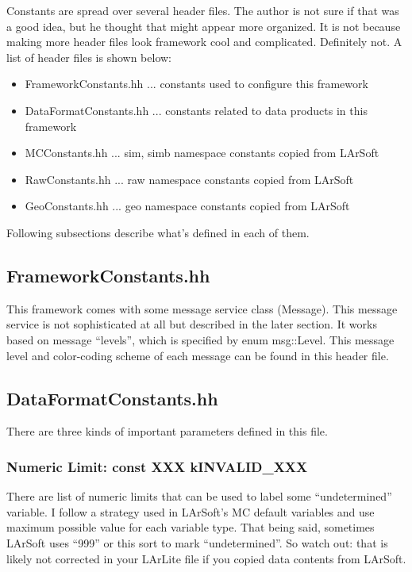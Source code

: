 
Constants are spread over several header files. 
The author is not sure if that was a good idea, but he thought that might appear more organized.
It is not because making more header files look framework cool and complicated. Definitely not.
A list of header files is shown below:
\begin{itemize}
\item[] {\ttfamily FrameworkConstants.hh} ... constants used to configure this framework
\item[] {\ttfamily DataFormatConstants.hh} ... constants related to data products in this framework
\item[] {\ttfamily MCConstants.hh} ... {\ttfamily sim}, {\ttfamily simb} namespace constants copied from LArSoft
\item[] {\ttfamily RawConstants.hh} ... {\ttfamily raw} namespace constants copied from LArSoft
\item[] {\ttfamily GeoConstants.hh} ... {\ttfamily geo} namespace constants copied from LArSoft
\end{itemize}
Following subsections describe what's defined in each of them.

\subsection{FrameworkConstants.hh}
This framework comes with some message service class ({\ttfamily Message}).
This message service is not sophisticated at all but described in the later section.
It works based on message ``levels'', which is specified by {\ttfamily enum msg::Level}.
This message level and color-coding scheme of each message can be found in this header file.

\subsection{DataFormatConstants.hh}
There are three kinds of important parameters defined in this file.

\subsubsection{Numeric Limit: {\ttfamily const XXX kINVALID\_XXX}}
There are list of numeric limits that can be used to label some ``undetermined'' variable.
I follow a strategy used in LArSoft's MC default variables and use maximum possible value
for each variable type. That being said, sometimes LArSoft uses ``999'' or this sort to
mark ``undetermined''. So watch out: that is likely not corrected in your LArLite file
if you copied data contents from LArSoft.

